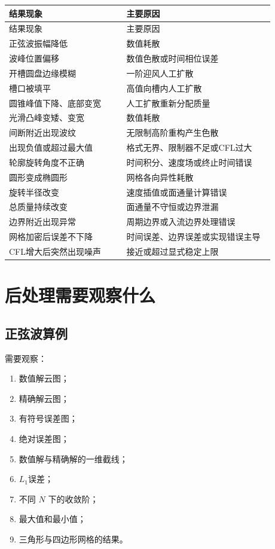 \documentclass[UTF8,12pt,a4paper,fontset=fandol]{ctexart}
\begin{document}
\begin{longtable}{L{0.39\linewidth}L{0.49\linewidth}}
\toprule
结果现象 & 主要原因\\
\midrule
\endfirsthead
\toprule
结果现象 & 主要原因\\
\midrule
\endhead
正弦波振幅降低 & 数值耗散\\
波峰位置偏移 & 数值色散或时间相位误差\\
开槽圆盘边缘模糊 & 一阶迎风人工扩散\\
槽口被填平 & 高值向槽内人工扩散\\
圆锥峰值下降、底部变宽 & 人工扩散重新分配质量\\
光滑凸峰变矮、变宽 & 数值耗散\\
间断附近出现波纹 & 无限制高阶重构产生色散\\
出现负值或超过最大值 & 格式无界、限制器不足或CFL过大\\
轮廓旋转角度不正确 & 时间积分、速度场或终止时间错误\\
圆形变成椭圆形 & 网格各向异性耗散\\
旋转半径改变 & 速度插值或面通量计算错误\\
总质量持续改变 & 面通量不守恒或边界泄漏\\
边界附近出现异常 & 周期边界或入流边界处理错误\\
网格加密后误差不下降 & 时间误差、边界误差或实现错误主导\\
CFL增大后突然出现噪声 & 接近或超过显式稳定上限\\
\bottomrule
\end{longtable}

\section{后处理需要观察什么}

\subsection{正弦波算例}

需要观察：

\begin{enumerate}
  \item 数值解云图；
  \item 精确解云图；
  \item 有符号误差图；
  \item 绝对误差图；
  \item 数值解与精确解的一维截线；
  \item $L_1$误差；
  \item 不同 $N$ 下的收敛阶；
  \item 最大值和最小值；
  \item 三角形与四边形网格的结果。
\end{enumerate}
\end{document}
